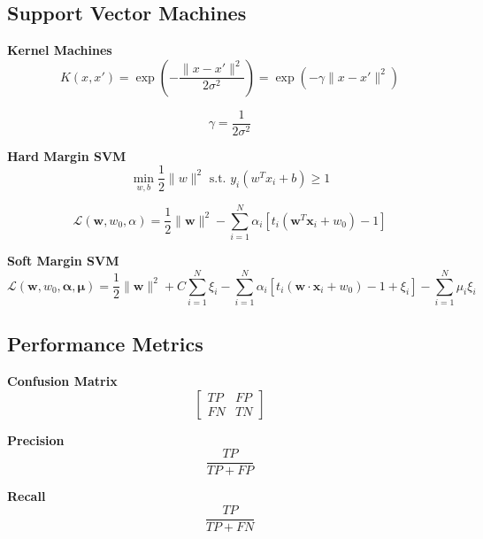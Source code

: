 \documentclass[8pt]{article}
\begin{document}
\begin{multicols}{2}
\subsection*{Support Vector Machines}
\textbf{Kernel Machines}
\begin{equation}
    K(x, x') = \exp(-\frac{\|x - x'\|^2}{2\sigma^2}) = \exp(-\gamma \|x - x'\|^2)
\end{equation}

\begin{equation}
    \gamma = \frac{1}{2\sigma^2}
\end{equation}

\textbf{Hard Margin SVM}
\begin{equation}
    \min_{w, b} \frac{1}{2} \|w\|^2 \text{ s.t. } y_i(w^Tx_i + b) \geq 1
\end{equation}

\begin{equation}
    \mathcal{L}(\mathbf{w}, w_0, \alpha) = \frac{1}{2} \|\mathbf{w}\|^2 - \sum_{i=1}^{N} \alpha_i[t_i(\mathbf{w}^T\mathbf{x}_i + w_0) - 1]
\end{equation}

\textbf{Soft Margin SVM}
{\small
    \begin{equation}
        \mathcal{L}(\mathbf{w}, w_0, \mathbf{\alpha}, \mathbf{\mu}) = \frac{1}{2} \|\mathbf{w}\|^2 + C \sum_{i=1}^{N} \xi_i - \sum_{i=1}^{N} \alpha_i[t_i(\mathbf{w} \cdot \mathbf{x}_i + w_0) - 1 + \xi_i] - \sum_{i=1}^{N} \mu_i \xi_i
    \end{equation}
}

\subsection*{Performance Metrics}
\textbf{Confusion Matrix}
\begin{equation}
    \begin{bmatrix}
        TP & FP \\
        FN & TN
    \end{bmatrix}
\end{equation}

\textbf{Precision}
\begin{equation}
    \frac{TP}{TP + FP}
\end{equation}

\textbf{Recall}
\begin{equation}
    \frac{TP}{TP + FN}
\end{equation}


\end{multicols}
\end{document}
